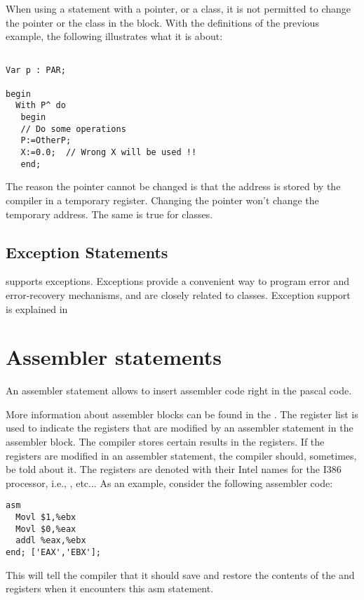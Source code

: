 \begin{remark}
When using a  statement with a pointer, or a class, it is not
permitted to change the pointer or the class in the  block.
With the definitions of the previous example, the following illustrates
what it is about:
\begin{verbatim}

Var p : PAR;

begin
  With P^ do
   begin
   // Do some operations
   P:=OtherP;
   X:=0.0;  // Wrong X will be used !!
   end;
\end{verbatim}
The reason the pointer cannot be changed is that the address is stored
by the compiler in a temporary register. Changing the pointer won't change
the temporary address. The same is true for classes.
\end{remark}

\subsection{Exception Statements}
\fpc supports exceptions. Exceptions provide a convenient way to
program error and error-recovery mechanisms, and are
closely related to classes.
Exception support is explained in 

\section{Assembler statements}
An assembler statement allows to insert assembler code right in the
pascal code.

More information about assembler blocks can be found in the \progref.
The register list is used to indicate the registers that are modified by an
assembler statement in the assembler block. The compiler stores certain results in the
registers. If  the registers are modified in an assembler statement, the compiler
should, sometimes, be told about it. The registers are denoted with their
Intel names for the I386 processor, i.e., ,  etc...
As an example, consider the following assembler code:
\begin{verbatim}
asm
  Movl $1,%ebx
  Movl $0,%eax
  addl %eax,%ebx
end; ['EAX','EBX'];
\end{verbatim}
This will tell the compiler that it should save and restore the contents of
the  and  registers when it encounters this asm statement.

